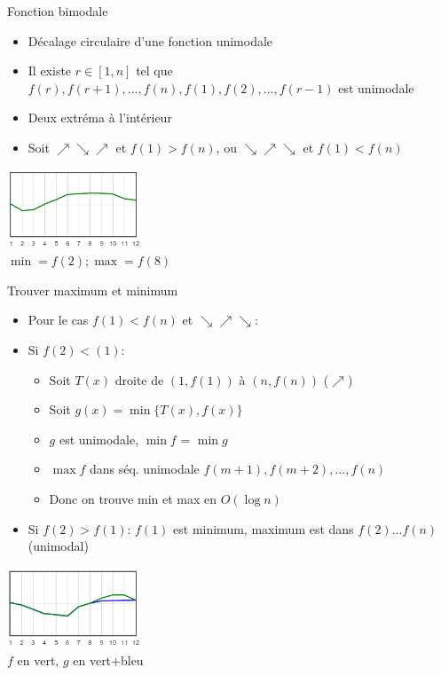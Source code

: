 \documentclass{beamer}
\begin{document}
\begin{frame}{Fonction bimodale}
	\begin{itemize}
	\item Décalage circulaire d'une fonction unimodale
	\item Il existe $r \in [1,n]$ tel que $f(r),f(r+1),...,f(n),f(1),f(2),...,f(r-1)$ est unimodale
	\item Deux extréma à l'intérieur
	\item Soit $\nearrow\searrow\nearrow$ et $f(1) > f(n)$, ou $\searrow\nearrow\searrow$ et $f(1) < f(n)$
	\end{itemize}
	\begin{center}
	\includegraphics[width=4cm]{bimodal.png}
	\\
	$\min = f(2); \max = f(8)$
	\end{center}
\end{frame}

\begin{frame}{Trouver maximum et minimum}
	\begin{itemize}
	\item Pour le cas $f(1) < f(n)$ et $\searrow\nearrow\searrow$:
	\item Si $f(2) < (1)$:
		\begin{itemize}
		\item Soit $T(x)$ droite de $(1, f(1))$ à $(n, f(n))$ ($\nearrow$){}
		\item Soit $g(x) = \min \{ T(x), f(x) \}$
		\item $g$ est unimodale, $\min f$ = $\min g$
		\item $\max f$ dans séq. unimodale $f(m+1),f(m+2),...,f(n)$
		\item Donc on trouve min et max en $O(\log n)$
		\end{itemize}
	\item Si $f(2) > f(1)$: $f(1)$ est minimum, maximum est dans $f(2)...f(n)$ (unimodal)
	\end{itemize}
	\begin{center}
	\includegraphics[width=4cm]{unibi.png}
	\\
	$f$ en vert, $g$ en vert+bleu
	\end{center}
\end{frame}
\end{document}
